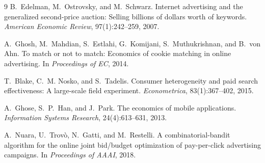 \documentclass{article}
\begin{document}
\begin{thebibliography}{9}
B.~Edelman, M.~Ostrovsky, and M.~Schwarz.
\newblock Internet advertising and the generalized second-price auction: Selling billions of dollars worth of keywords.
\newblock \emph{American Economic Review}, 97(1):242--259, 2007.

A.~Ghosh, M.~Mahdian, S.~Estlahi, G.~Komijani, S.~Muthukrishnan, and B.~von Ahn.
\newblock To match or not to match: Economics of cookie matching in online advertising.
\newblock In \emph{Proceedings of EC}, 2014.

T.~Blake, C.~M. Nosko, and S.~Tadelis.
\newblock Consumer heterogeneity and paid search effectiveness: A large-scale field experiment.
\newblock \emph{Econometrica}, 83(1):367--402, 2015.

A.~Ghose, S.~P.~Han, and J.~Park.
\newblock The economics of mobile applications.
\newblock \emph{Information Systems Research}, 24(4):613--631, 2013.

A.~Nuara, U.~Trov\`{o}, N.~Gatti, and M.~Restelli.
\newblock A combinatorial-bandit algorithm for the online joint bid/budget optimization of pay-per-click advertising campaigns.
\newblock In \emph{Proceedings of AAAI}, 2018.
\end{thebibliography}
\end{document}
